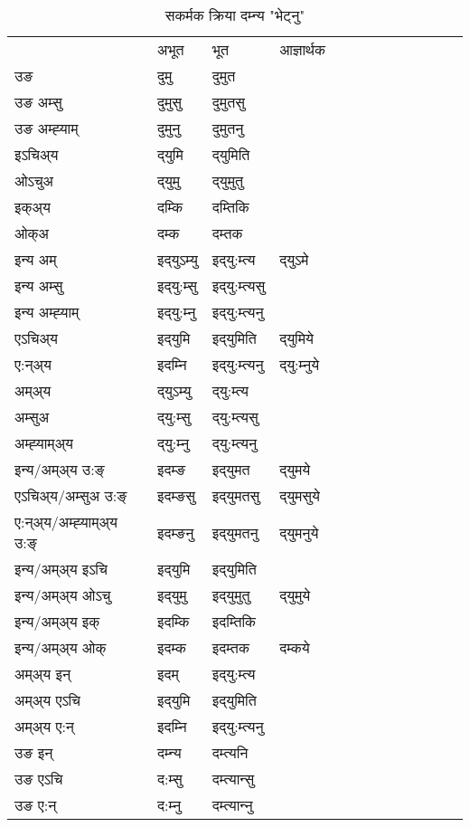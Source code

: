 \begin{table}[H]
\label{um.vt} \centering
\caption{सकर्मक क्रिया  दम्‍न्य  "भेट्नु"  }
\begin{tabular}{l|l|l|l|l|l|l|l|l|l|l|l|l}  \toprule
&अभूत & भूत & आज्ञार्थक \\ 
उङ &दुमु &दुमुत \\ 
उङ अम्सु &दुमुसु &दुमुतसु \\ 
उङ अम्ह्‍याम् &दुमुनु &दुमुतनु \\ 
इऽचिअ्य &द्‌युमि &द्‌युमिति   \\ 
ओऽचुअ &द्‌युमु &द्‌युमुतु   \\ 
इक्अ्य &दम्कि &दम्तिकि   \\ 
ओक्अ &दम्क &दम्तक   \\ 
इन्य अम् & इद्‌युऽम्यु  & इद्‌यु:म्त्य &द्‌युऽमे  \\ 
इन्य अम्सु & इद्‌यु:म्सु  & इद्‌यु:म्त्यसु   \\ 
इन्य अम्ह्‍याम् & इद्‌यु:म्‍नु  & इद्‌यु:म्त्यनु   \\ 
एऽचिअ्य & इद्‌युमि & इद्‌युमिति &द्‌युमिये    \\ 
ए:न्अ्य & इदम्‍नि  & इद्‌यु:म्त्यनु &द्‌यु:म्‍नुये  \\ 
अम्अ्य & द्‌युऽम्यु  & द्‌यु:म्त्य  \\ 
अम्सुअ & द्‌यु:म्सु & द्‌यु:म्त्यसु  \\ 
अम्ह्‍याम्अ्य & द्‌यु:म्‍नु  & द्‌यु:म्त्यनु \\ 
\midrule
इन्य/अम्अ्य उ:ङ्‌&इदम्ङ & इद्‌युमत &द्‌युमये \\ 
एऽचिअ्य/अम्सुअ उ:ङ्‌ &इदम्ङसु & इद्‌युमतसु &द्‌युमसुये \\ 
ए:न्अ्य/अम्ह्‍याम्अ्य उ:ङ्‌ &इदम्ङनु & इद्‌युमतनु &द्‌युमनुये \\ 
इन्य/अम्अ्य इऽचि & इद्‌युमि & इद्‌युमिति    \\ 
इन्य/अम्अ्य ओऽचु & इद्‌युमु & इद्‌युमुतु  &द्‌युमुये  \\ 
इन्य/अम्अ्य इक् & इदम्कि & इदम्तिकि   \\ 
इन्य/अम्अ्य ओक् & इदम्क & इदम्तक  &दम्कये  \\ 
अम्अ्य इन् & इदम् & इद्‌यु:म्त्य   \\ 
अम्अ्य एऽचि & इद्‌युमि & इद्‌युमिति    \\ 
अम्अ्य ए:न् & इदम्‍नि  & इद्‌यु:म्त्यनु  \\ 
\midrule
उङ इन् & दम्‍न्य  & दम्त्यनि  \\ 
उङ एऽचि & द:म्सु  & दम्त्यान्सु   \\ 
उङ ए:न्& द:म्‍नु  & दम्त्यान्‍नु   \\ 
\bottomrule
\end{tabular}
\end{table}


